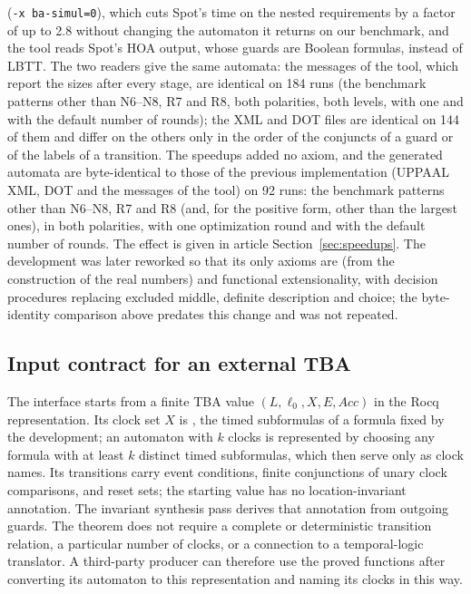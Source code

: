 (\texttt{-x ba-simul=0}), which cuts Spot's time on the nested requirements by a factor of up to 2.8
without changing the automaton it returns on our benchmark, and the tool reads
Spot's HOA output, whose guards are Boolean formulas, instead of LBTT. The
two readers give the same automata: the messages of the tool, which report the
sizes after every stage, are identical on 184 runs (the benchmark patterns other
than N6--N8, R7 and R8, both polarities, both levels, with one and with the
default number of rounds); the XML and DOT files are identical on 144 of them
and differ on the others only in the order of the conjuncts of a guard or of the
labels of a transition.
The speedups added no axiom, and the generated automata are byte-identical to those of the
previous implementation (UPPAAL XML, DOT and the messages of the tool) on 92
runs: the benchmark patterns other than N6--N8, R7 and R8 (and, for the positive
form, other than the largest ones), in both polarities, with one optimization
round and with the default number of rounds. The effect is given in article Section~\ref{sec:speedups}. The development was later reworked so that its only axioms are  (from the construction of the real numbers) and functional extensionality, with decision procedures replacing excluded middle, definite description and choice; the byte-identity comparison above predates this change and was not repeated.

\subsection{Input contract for an external TBA}
\label{sec:generic-input-detail}
The interface starts from a finite TBA value
$(L,\ell_0,X,E,\mathit{Acc})$ in the Rocq representation. Its clock set
$X$ is , the timed subformulas of a formula 
fixed by the development; an automaton with $k$ clocks is represented by
choosing any formula with at least $k$ distinct timed subformulas, which then
serve only as clock names. Its transitions carry
event conditions, finite conjunctions of unary clock comparisons, and reset
sets; the starting value has no location-invariant annotation. The invariant
synthesis pass derives that annotation from outgoing guards. The theorem
does not require a complete or deterministic transition relation, a particular
number of clocks, or a connection to a temporal-logic translator. A third-party
producer can therefore use the proved functions after converting its automaton
to this representation and naming its clocks in this way.


